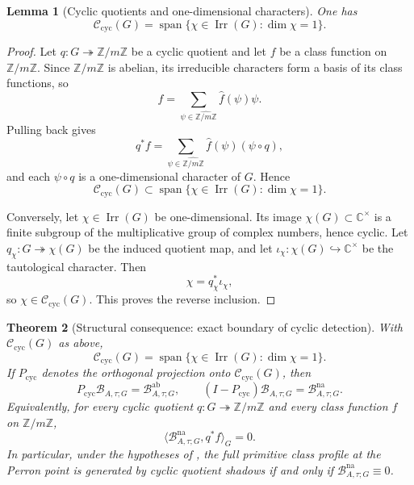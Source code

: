 \documentclass[11pt,a4paper]{amsart}
\theoremstyle{plain}
\newtheorem{theorem}{Theorem}[section]
\newtheorem{lemma}[theorem]{Lemma}
\theoremstyle{definition}
\theoremstyle{remark}
\DeclareMathOperator{\Irr}{Irr}
\newcommand{\CC}{\mathbb{C}}
\newcommand{\ZZ}{\mathbb{Z}}
\begin{document}
\begin{lemma}[Cyclic quotients and one-dimensional characters]
  \label{lem:cyclic-quotients-one-dimensional-characters}
  One has
  \[
    \mathscr C_{\mathrm{cyc}}(G)
    =
    \operatorname{span}\{\chi\in\Irr(G):\dim\chi=1\}.
  \]
\end{lemma}

\begin{proof}
  Let \(q:G\twoheadrightarrow \ZZ/m\ZZ\) be a cyclic quotient and let
  \(f\) be a class function on \(\ZZ/m\ZZ\). Since \(\ZZ/m\ZZ\) is
  abelian, its irreducible characters form a basis of its class
  functions, so
  \[
    f=\sum_{\psi\in\widehat{\ZZ/m\ZZ}}\widehat f(\psi)\psi.
  \]
  Pulling back gives
  \[
    q^\ast f
    =
    \sum_{\psi\in\widehat{\ZZ/m\ZZ}}
      \widehat f(\psi)(\psi\circ q),
  \]
  and each \(\psi\circ q\) is a one-dimensional character of \(G\).
  Hence
  \[
    \mathscr C_{\mathrm{cyc}}(G)
    \subset
    \operatorname{span}\{\chi\in\Irr(G):\dim\chi=1\}.
  \]

  Conversely, let \(\chi\in\Irr(G)\) be one-dimensional. Its image
  \(\chi(G)\subset\CC^\times\) is a finite subgroup of the multiplicative
  group of complex numbers, hence cyclic. Let
  \(q_\chi:G\twoheadrightarrow \chi(G)\) be the induced quotient map,
  and let \(\iota_\chi:\chi(G)\hookrightarrow \CC^\times\) be the
  tautological character. Then
  \[
    \chi=q_\chi^\ast\iota_\chi,
  \]
  so \(\chi\in\mathscr C_{\mathrm{cyc}}(G)\). This proves the reverse
  inclusion.
\end{proof}

\begin{theorem}[Structural consequence: exact boundary of cyclic
  detection]
  \label{thm:cyclic-detection-boundary}
  With \(\mathscr C_{\mathrm{cyc}}(G)\) as above,
  \[
    \mathscr C_{\mathrm{cyc}}(G)
    =
    \operatorname{span}\{\chi\in\Irr(G):\dim\chi=1\}.
  \]
  If \(P_{\mathrm{cyc}}\) denotes the orthogonal projection onto
  \(\mathscr C_{\mathrm{cyc}}(G)\), then
  \[
    P_{\mathrm{cyc}}\mathcal B_{A,\tau;G}=\mathcal B_{A,\tau;G}^{\mathrm{ab}},
    \qquad
    (I-P_{\mathrm{cyc}})\mathcal B_{A,\tau;G}=\mathcal B_{A,\tau;G}^{\mathrm{na}}.
  \]
  Equivalently, for every cyclic quotient \(q:G\twoheadrightarrow \ZZ/m\ZZ\)
  and every class function \(f\) on \(\ZZ/m\ZZ\),
  \[
    \langle \mathcal B_{A,\tau;G}^{\mathrm{na}},q^\ast f\rangle_G=0.
  \]
  In particular, under the hypotheses of
  , the full primitive class profile at
  the Perron point is generated by cyclic quotient shadows if and only if
  \(\mathcal B_{A,\tau;G}^{\mathrm{na}}\equiv 0\).
\end{theorem}
\end{document}
